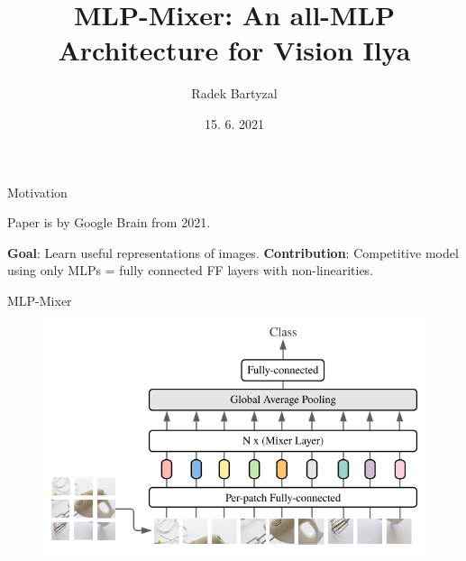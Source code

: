 \documentclass{beamer}
\begin{document}
\title[MLP-Mixer]{MLP-Mixer: An all-MLP Architecture for Vision
Ilya}  
\author{Radek Bartyzal}
\date{15. 6. 2021} 

\frame{\titlepage} 

\begin{frame}{Motivation}

Paper is by Google Brain from 2021.
\vfill

\textbf{Goal}:
Learn useful representations of images.
\vfill
\textbf{Contribution}:
Competitive model using only MLPs = fully connected FF layers with non-linearities.


\end{frame}
\begin{frame}{MLP-Mixer}

\begin{figure}[h]
\includegraphics[width=\textwidth]{img/arch}
\end{figure}

\end{frame}
\end{document}
